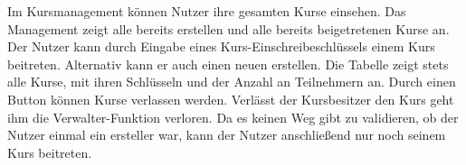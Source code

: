 Im Kursmanagement können Nutzer ihre gesamten Kurse einsehen.
Das Management zeigt alle bereits erstellen und alle bereits beigetretenen Kurse an.
Der Nutzer kann durch Eingabe eines Kurs-Einschreibeschlüssels einem Kurs beitreten.
Alternativ kann er auch einen neuen erstellen.
Die Tabelle zeigt stets alle Kurse, mit ihren Schlüsseln und der Anzahl an Teilnehmern an.
Durch einen Button können Kurse verlassen werden.
Verlässt der Kursbesitzer den Kurs geht ihm die Verwalter-Funktion verloren.
Da es keinen Weg gibt zu validieren, ob der Nutzer einmal ein ersteller war, kann der Nutzer anschließend nur noch seinem Kurs beitreten.

